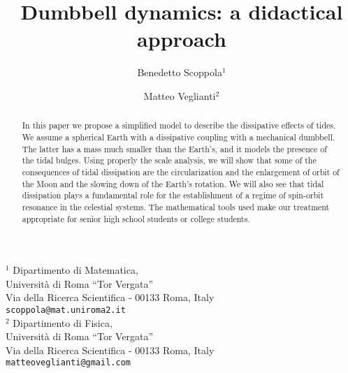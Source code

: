 \documentclass[11pt, oneside,reqno]{amsart}
\begin{document}
\title
{Dumbbell dynamics: a didactical approach}

\author{
Benedetto Scoppola$^{1}$ \and
Matteo Veglianti$^{2}$}

\date{}

\maketitle

\begin{center}
{\footnotesize
\vspace{0.3cm}$^{1}$  Dipartimento di Matematica,\\
Universit\`a di Roma
``Tor Vergata''\\
Via della Ricerca Scientifica - 00133 Roma, Italy\\
\texttt{scoppola@mat.uniroma2.it}\\

\vspace{0.3cm} $^{2}$ Dipartimento di  Fisica,\\ Universit\`a di Roma
``Tor Vergata''\\
Via della Ricerca Scientifica - 00133 Roma, Italy\\
\texttt{matteoveglianti@gmail.com}\\ 
}

\end{center}


\begin{abstract}
In this paper we propose a simplified model to describe the dissipative effects of tides. We assume a spherical Earth with a dissipative coupling with a mechanical dumbbell. The latter has a mass much smaller than the Earth's, and it models the presence of the tidal bulges.
Using properly the scale analysis, we will show that some of the consequences of tidal dissipation are the circularization and the enlargement of orbit of the Moon and the slowing down of the Earth's rotation. We will also see that tidal dissipation plays a fundamental role for the establishment of a regime of spin-orbit resonance in the celestial systems. The mathematical tools used make our treatment appropriate for senior high school students or college students.
\end{abstract}
\end{document}
